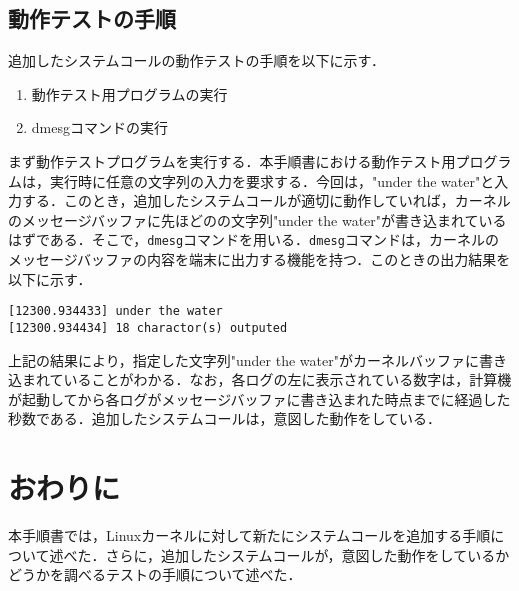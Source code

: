 \documentclass[12pt]{jsarticle}
\begin{document}
\subsection{動作テストの手順}
追加したシステムコールの動作テストの手順を以下に示す．
\begin{enumerate}
\item 動作テスト用プログラムの実行
\item dmesgコマンドの実行
\end{enumerate}
まず動作テストプログラムを実行する．本手順書における動作テスト用プログラムは，実行時に任意の文字列の入力を要求する．今回は，"under the water"と入力する．このとき，追加したシステムコールが適切に動作していれば，カーネルのメッセージバッファに先ほどのの文字列"under the water"が書き込まれているはずである．そこで，\verb|dmesg|コマンドを用いる．\verb|dmesg|コマンドは，カーネルのメッセージバッファの内容を端末に出力する機能を持つ．このときの出力結果を以下に示す．
\begin{verbatim}
[12300.934433] under the water
[12300.934434] 18 charactor(s) outputed
\end{verbatim}
上記の結果により，指定した文字列"under the water"がカーネルバッファに書き込まれていることがわかる．なお，各ログの左に表示されている数字は，計算機が起動してから各ログがメッセージバッファに書き込まれた時点までに経過した秒数である．追加したシステムコールは，意図した動作をしている．
\section{おわりに}
本手順書では，Linuxカーネルに対して新たにシステムコールを追加する手順について述べた．さらに，追加したシステムコールが，意図した動作をしているかどうかを調べるテストの手順について述べた．



\end{document}
